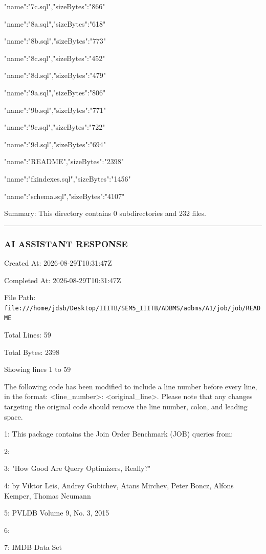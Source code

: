 \documentclass[11pt,a4paper]{article}
\begin{document}
{"name":"7c.sql","sizeBytes":"866"}

{"name":"8a.sql","sizeBytes":"618"}

{"name":"8b.sql","sizeBytes":"773"}

{"name":"8c.sql","sizeBytes":"452"}

{"name":"8d.sql","sizeBytes":"479"}

{"name":"9a.sql","sizeBytes":"806"}

{"name":"9b.sql","sizeBytes":"771"}

{"name":"9c.sql","sizeBytes":"722"}

{"name":"9d.sql","sizeBytes":"694"}

{"name":"README","sizeBytes":"2398"}

{"name":"fkindexes.sql","sizeBytes":"1456"}

{"name":"schema.sql","sizeBytes":"4107"}


Summary: This directory contains 0 subdirectories and 232 files.


\hrule

\subsubsection{AI ASSISTANT RESPONSE}

Created At: 2026-08-29T10:31:47Z

Completed At: 2026-08-29T10:31:47Z

File Path: \texttt{file:///home/jdsb/Desktop/IIITB/SEM5\_IIITB/ADBMS/adbms/A1/job/job/README}

Total Lines: 59

Total Bytes: 2398

Showing lines 1 to 59

The following code has been modified to include a line number before every line, in the format: <line\_number>: <original\_line>. Please note that any changes targeting the original code should remove the line number, colon, and leading space.

1: This package contains the Join Order Benchmark (JOB) queries from:

2:

3: "How Good Are Query Optimizers, Really?"

4: by Viktor Leis, Andrey Gubichev, Atans Mirchev, Peter Boncz, Alfons Kemper, Thomas Neumann

5: PVLDB Volume 9, No. 3, 2015

6:

7: IMDB Data Set
\end{document}

